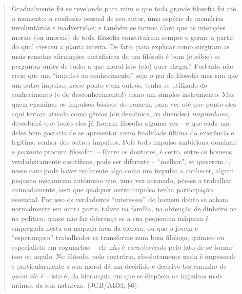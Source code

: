 \documentclass[
	12pt,				%
	openright,			%
	oneside,			%
	a4paper,			%
	english,			%
	french,				%
	spanish,			%
	brazil				%
	]{abntex2}
\begin{document}
\begin{quotation}
Gradualmente foi se revelando para mim o que toda grande filosofia foi até o momento: a confissão pessoal de seu autor, uma espécie de memórias involuntárias e inadvertidas; e também se tornou claro que as intenções morais (ou imorais) de toda filosofia constituíram sempre o germe a partir do qual cresceu a planta inteira. De fato, para explicar como surgiram as mais remotas afirmações metafísicas de um filósofo é bom (e sábio) se perguntar antes de tudo: a que moral isto (ele) quer chegar? Portanto não creio que um “impulso ao conhecimento” seja o pai da filosofia mas sim que um outro impulso, nesse ponto e em outros, tenha se utilizado do conhecimento (e do desconhecimento!) como um simples instrumento. Mas quem examinar os impulsos básicos do homem, para ver até que ponto eles aqui teriam atuado como gênios (ou demônios, ou duendes) \textit{inspiradores}, descobrirá que todos eles já fizeram filosofia alguma vez – e que cada um deles bem gostaria de se apresentar como finalidade última da existência e legítimo senhor dos outros impulsos. Pois todo impulso ambiciona dominar: e \textit{portanto} procura filosofar. – Entre os doutores, é certo, entre os homens verdadeiramente científicos, pode ser diferente – “melhor”, se quiserem –, nesse caso pode haver realmente algo como um impulso a conhecer, algum pequeno mecanismo autônomo que, uma vez acionado, põe-se a trabalhar animadamente, sem que qualquer outro impulso tenha participação essencial. Por isso os verdadeiros “interesses” do homem douto se acham normalmente em outra parte, talvez na família, na obtenção de dinheiro ou na política; quase não faz diferença se a sua pequenina máquina é empregada nesta ou naquela área da ciência, ou que o jovem e “esperançoso” trabalhador se transforme num bom filólogo, químico ou especialista em cogumelos: – ele não é \textit{caracterizado} pelo fato de se tornar isso ou aquilo. No filósofo, pelo contrário, absolutamente nada é impessoal; e particularmente a sua moral dá um decidido e decisivo testemunho \textit{de quem ele é} – isto é, da hierarquia em que se dispõem os impulsos mais íntimos da sua natureza. (JGB/ABM, §6). 
\end{quotation}
\end{document}
